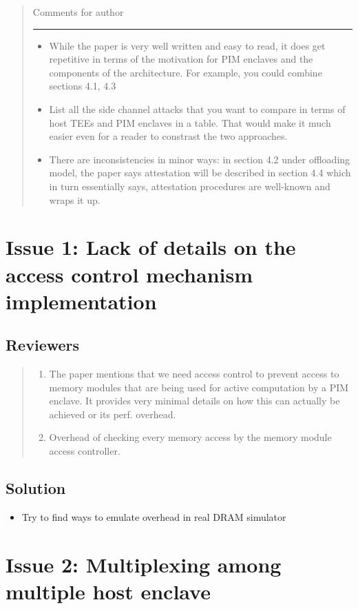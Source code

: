 \documentclass[11pt]{article}
\begin{document}
\begin{quote}
Comments for author

\noindent\rule{\textwidth}{0.5pt}
\begin{itemize}
\item While the paper is very well written and easy to read, it does get repetitive in terms of the motivation for PIM enclaves and the components of the architecture. For example, you could combine sections 4.1, 4.3
\item List all the side channel attacks that you want to compare in terms of host TEEs and PIM enclaves in a table. That would make it much easier even for a reader to constrast the two approaches.
\item There are inconsistencies in minor ways: in section 4.2 under offloading model, the paper says attestation will be described in section 4.4 which in turn essentially says, attestation procedures are well-known and wraps it up.
\end{itemize}
\end{quote}

\section{Issue 1: Lack of details on the access control mechanism implementation}
\label{sec:org8dd3409}
\subsection{Reviewers}
\label{sec:orgd268154}
\begin{quote}
\begin{enumerate}
\item The paper mentions that we need access control to prevent access to memory modules that are being used for active computation by a PIM enclave. It provides very minimal details on how this can actually be achieved or its perf. overhead.
\item Overhead of checking every memory access by the memory module access controller.
\end{enumerate}
\end{quote}
\subsection{Solution}
\label{sec:org5ab34ed}
\begin{itemize}
\item Try to find ways to emulate overhead in real DRAM simulator
\end{itemize}
\section{Issue 2: Multiplexing among multiple host enclave}
\label{sec:org635adad}
\end{document}
